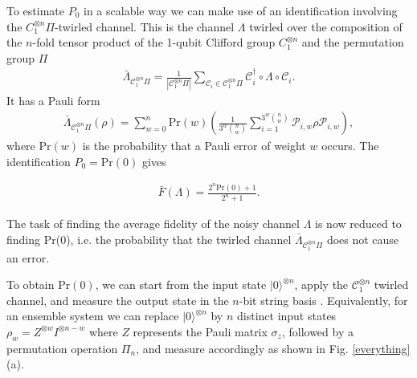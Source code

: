 \documentclass[prl,twocolumn,showpacs,superscriptaddress]{revtex4-1}
\newcommand{\ket}[1]{|#1\rangle}
\begin{document}
To estimate $P_0$ in a scalable  way  we can make use of an identification involving  the $C_1^{\otimes n} \Pi$-twirled channel. This is the channel $\Lambda$ twirled over the composition of the $n$-fold tensor product of the 1-qubit Clifford group $C_1^{\otimes n}$ and  the  permutation group $ \Pi$
  \begin{align} \label{C1_twirl}
\bar{\Lambda}_{\mathcal{C}_1^{\otimes n}\Pi} = \frac{1}{|\mathcal{C}_1^{\otimes n}\Pi|}\sum_{\mathcal{C}_i\in \mathcal{C}_1^{\otimes n}\Pi} \mathcal{C}_i^{\dagger} \circ \Lambda \circ \mathcal{C}_i.
\end{align}
It has a Pauli form
\begin{align} \label{C1_twirlrho}
\bar{\Lambda}_{\mathcal{C}_1^{\otimes n}\Pi}(\rho) = \sum_{w=0}^n \text{Pr}(w) \left ( \frac{1}{3^w \binom{n}{w}} \sum_{i=1}^{3^w \binom{n}{w}} \mathcal{P}_{i,w} \rho \mathcal{P}_{i,w} \right ),
\end{align}
where $\text{Pr}(w)$ is the probability that a Pauli error of weight $w$ occurs.  The identification $P_0=\text{Pr}(0)$  \cite{Silva2008} gives

\begin{align} \label{fidelity_pr}
\bar{F}(\Lambda) = \frac{2^n \text{Pr}(0) +1}{2^n +1}.
\end{align}

The task of finding the average fidelity of the noisy channel $\Lambda$ is now reduced to finding Pr(0), i.e. the probability that the twirled  channel $\bar{\Lambda}_{\mathcal{C}_1^{\otimes n} \Pi}$ does not cause an error.





To obtain $\text{Pr}(0)$, we can start from the input state $\ket{0}^{\otimes n}$, apply the $\mathcal{C}_1^{\otimes n}$ twirled channel, and measure the output state in the $n$-bit string basis \cite{Emerson2007}.  Equivalently, for an ensemble system we can replace $\ket{0}^{\otimes n}$ by $n$ distinct input states $\rho_w = Z^{\otimes w}I^{\otimes n-w}$ where $Z$ represents the Pauli matrix $\sigma_z$, followed by a permutation operation $\Pi_n$, and measure accordingly as shown in Fig. \ref{everything}(a).
\end{document}
